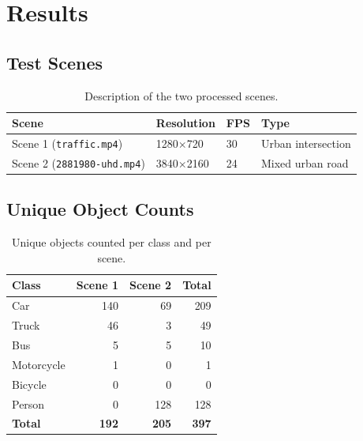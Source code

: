 \documentclass[12pt,a4paper,leqno]{report}
\begin{document}
\chapter{Results}

\section{Test Scenes}

\begin{table}[H]
  \centering
  \caption{Description of the two processed scenes.}
  \begin{tabular}{llll}
    \toprule
    \textbf{Scene} & \textbf{Resolution} & \textbf{FPS} & \textbf{Type}\\
    \midrule
    Scene 1 (\texttt{traffic.mp4}) & 1280$\times$720 & 30 & Urban intersection\\
    Scene 2 (\texttt{2881980-uhd.mp4}) & 3840$\times$2160 & 24 & Mixed urban road\\
    \bottomrule
  \end{tabular}
\end{table}

\section{Unique Object Counts}

\begin{table}[H]
  \centering
  \caption{Unique objects counted per class and per scene.}
  \label{tab:counts}
  \begin{tabular}{lrrr}
    \toprule
    \textbf{Class} & \textbf{Scene 1} & \textbf{Scene 2} & \textbf{Total}\\
    \midrule
    Car        & 140 & 69  & 209\\
    Truck      & 46  & 3   & 49\\
    Bus        & 5   & 5   & 10\\
    Motorcycle & 1   & 0   & 1\\
    Bicycle    & 0   & 0   & 0\\
    Person     & 0   & 128 & 128\\
    \midrule
    \textbf{Total} & \textbf{192} & \textbf{205} & \textbf{397}\\
    \bottomrule
  \end{tabular}
\end{table}
\end{document}
